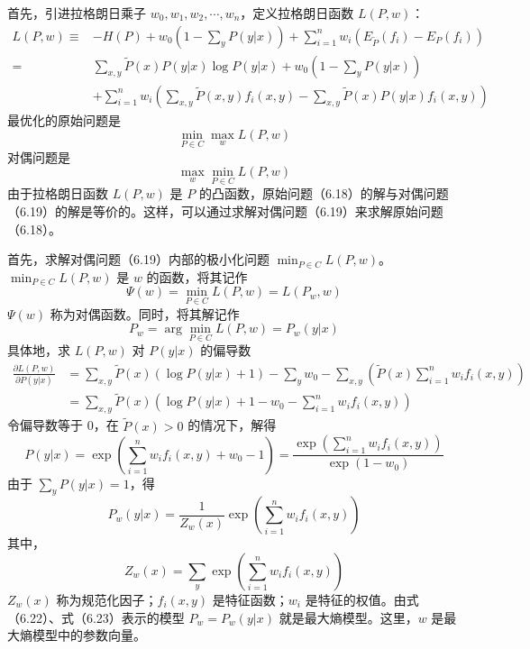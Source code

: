 \documentclass[UTF8,12pt,a4paper,fontset=fandol]{ctexart}
\begin{document}
首先，引进拉格朗日乘子 $w_0,w_1,w_2,\cdots,w_n$，定义拉格朗日函数 $L(P,w)$：
\begin{equation}
\begin{aligned}
L(P,w)\equiv{}& -H(P)+w_0\left(1-\sum_y P(y|x)\right)+\sum_{i=1}^n w_i\left(E_{\tilde{P}}(f_i)-E_P(f_i)\right)\\
={}& \sum_{x,y}\tilde{P}(x)P(y|x)\log P(y|x)+w_0\left(1-\sum_y P(y|x)\right)\\
&+\sum_{i=1}^n w_i\left(\sum_{x,y}\tilde{P}(x,y)f_i(x,y)-\sum_{x,y}\tilde{P}(x)P(y|x)f_i(x,y)\right)
\end{aligned}
\tag{6.17}
\end{equation}
最优化的原始问题是
\begin{equation}
\min_{P\in C}\max_w L(P,w)
\tag{6.18}
\end{equation}
对偶问题是
\begin{equation}
\max_w\min_{P\in C}L(P,w)
\tag{6.19}
\end{equation}
由于拉格朗日函数 $L(P,w)$ 是 $P$ 的凸函数，原始问题（6.18）的解与对偶问题（6.19）的解是等价的。这样，可以通过求解对偶问题（6.19）来求解原始问题（6.18）。

首先，求解对偶问题（6.19）内部的极小化问题 $\min_{P\in C}L(P,w)$。$\min_{P\in C}L(P,w)$ 是 $w$ 的函数，将其记作
\begin{equation}
\Psi(w)=\min_{P\in C}L(P,w)=L(P_w,w)
\tag{6.20}
\end{equation}
$\Psi(w)$ 称为对偶函数。同时，将其解记作
\begin{equation}
P_w=\arg\min_{P\in C}L(P,w)=P_w(y|x)
\tag{6.21}
\end{equation}
具体地，求 $L(P,w)$ 对 $P(y|x)$ 的偏导数
\[
\begin{aligned}
\frac{\partial L(P,w)}{\partial P(y|x)}
&=\sum_{x,y}\tilde{P}(x)(\log P(y|x)+1)-\sum_y w_0-\sum_{x,y}\left(\tilde{P}(x)\sum_{i=1}^n w_i f_i(x,y)\right)\\
&=\sum_{x,y}\tilde{P}(x)\left(\log P(y|x)+1-w_0-\sum_{i=1}^n w_i f_i(x,y)\right)
\end{aligned}
\]
令偏导数等于 0，在 $\tilde{P}(x)>0$ 的情况下，解得
\[
P(y|x)=\exp\left(\sum_{i=1}^n w_i f_i(x,y)+w_0-1\right)
=\frac{\exp\left(\sum_{i=1}^n w_i f_i(x,y)\right)}{\exp(1-w_0)}
\]
由于 $\sum_y P(y|x)=1$，得
\begin{equation}
P_w(y|x)=\frac{1}{Z_w(x)}\exp\left(\sum_{i=1}^n w_i f_i(x,y)\right)
\tag{6.22}
\end{equation}
其中，
\begin{equation}
Z_w(x)=\sum_y\exp\left(\sum_{i=1}^n w_i f_i(x,y)\right)
\tag{6.23}
\end{equation}
$Z_w(x)$ 称为规范化因子；$f_i(x,y)$ 是特征函数；$w_i$ 是特征的权值。由式（6.22）、式（6.23）表示的模型 $P_w=P_w(y|x)$ 就是最大熵模型。这里，$w$ 是最大熵模型中的参数向量。
\end{document}
